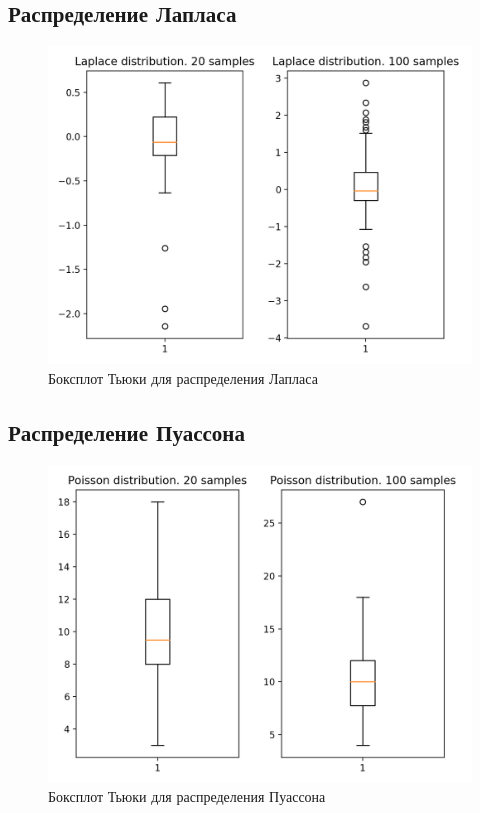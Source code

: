 \subsection{Распределение Лапласа}
\begin{figure}[H]
	\begin{center}
		\includegraphics[scale=0.7]{fig/Laplace distribution.png}
		\caption{Боксплот Тьюки для распределения Лапласа} 
		\label{pic:pic_name}
	\end{center}
\end{figure}


\subsection{Распределение Пуассона}
\begin{figure}[H]
	\begin{center}
		\includegraphics[scale=0.7]{fig/Poisson distribution.png}
		\caption{Боксплот Тьюки для распределения Пуассона} 
		\label{pic:pic_name} 
	\end{center}
\end{figure}


